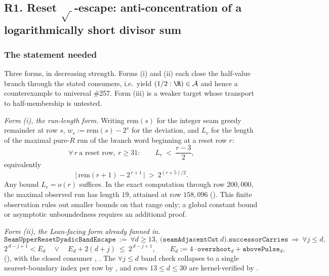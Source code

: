 \subsection{R1. Reset \texorpdfstring{\(\sqrt{\ }\)}{square-root}-escape:
anti-concentration of a logarithmically short divisor sum}
\label{sec:invent-R1}

\subsubsection*{The statement needed}

Three forms, in decreasing strength. Forms (i) and (ii) each close the half-value branch through
the stated consumers, i.e.\ yield $(1/2:\R)\in\mathcal{A}$ and hence a counterexample to universal
\#257. Form (iii) is a weaker target whose transport to half-membership is untested.

\emph{Form (i), the run-length form.} Writing $\mathrm{rem}(s)$ for the integer seam greedy
remainder at row $s$, $w_s := \mathrm{rem}(s)-2^{s}$ for the deviation, and $L_r$ for the length
of the maximal pure-$R$ run of the branch word beginning at a reset row $r$:
\[
\forall\, r\ \text{a reset row},\ r\ge 31:\qquad L_r\ <\ \frac{r-3}{2},
\]
equivalently
\[
\bigl|\,\mathrm{rem}(r+1)-2^{\,r+1}\,\bigr|\ >\ 2^{(r+5)/2}.
\]
Any bound $L_r=o(r)$ suffices. In the exact computation through row $200{,}000$, the maximal
observed run has length $19$, attained at row $158{,}096$ (). This finite observation
rules out smaller bounds on that range only; a global constant bound or asymptotic unboundedness
requires an additional proof.

\emph{Form (ii), the Lean-facing form already fanned in.}
\[
\mathtt{SeamUpperResetDyadicBandEscape}\ :=\ \forall d\ge 13,\ \bigl(\mathtt{seamAdjacentCut}\ d\bigr).\mathtt{successorCarries}\ \Longrightarrow\ \forall j\le d,
\]
\[
2^{\,d-j+1} < E_d\quad\lor\quad E_d + 2(d+j)\ \le\ 2^{\,d-j+1},
\qquad
E_d := 4\cdot\mathtt{overshoot}_d+\mathtt{abovePulse}_d,
\]
(), with the
closed consumer
,
. The $\forall j\le d$ band check collapses to a single nearest-boundary index per row by
, and rows
$13\le d\le 30$ are kernel-verified by
.

